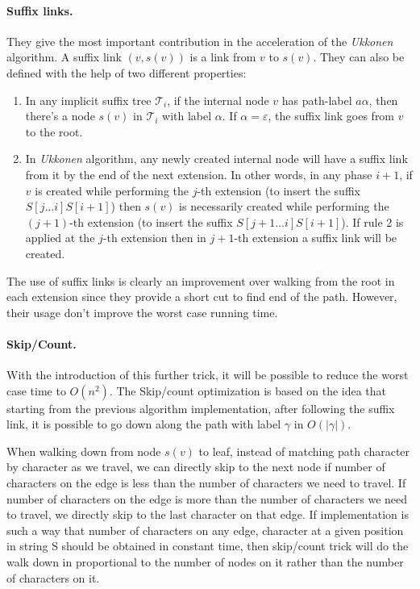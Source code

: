 \paragraph*{Suffix links.} They give the most important contribution in the acceleration of the \textit{Ukkonen} algorithm. A suffix link $(v, s(v))$ is a link from $v$ to $s(v)$. They can also be defined with the help of two different properties:
\begin{enumerate}
	\item In any implicit suffix tree $\mathcal{T}_i$, if the internal node $v$ has path-label $a \alpha$, then there's a node $s(v)$ in $\mathcal{T}_i$ with label $\alpha$. If $\alpha = \varepsilon$, the suffix link goes from $v$ to the root.
	\item In \textit{Ukkonen} algorithm, any newly created internal node will have a suffix link from it by the end of the next extension. In other words, in any phase $i+1$, if $v$ is created while performing the $j$-th extension (to insert the suffix $S[j \dots i]S[i+1]$) then $s(v)$ is necessarily created while performing the $(j+1)$-th extension (to insert the suffix $S[j+1 \dots i]S[i+1]$). If rule 2 is applied at the $j$-th extension then in $j+1$-th extension a suffix link will be created.
\end{enumerate} 
The use of suffix links is clearly an improvement over walking from the root in each extension since they provide a short cut to find end of the path. However, their usage don't improve the worst case running time.

\paragraph*{Skip/Count.} With the introduction of this further trick, it will be possible to reduce the worst case time to $O(n^2)$. The Skip/count optimization is based on the idea that starting from the previous algorithm implementation, after following the suffix link, it is possible to go down along the path with label $\gamma$ in $O(|\gamma|)$. 

When walking down from node $s(v)$ to leaf, instead of matching path character by character as we travel, we can directly skip to the next node if number of characters on the edge is less than the number of characters we need to travel. If number of characters on the edge is more than the number of characters we need to travel, we directly skip to the last character on that edge.
If implementation is such a way that number of characters on any edge, character at a given position in string S should be obtained in constant time, then skip/count trick will do the walk down in proportional to the number of nodes on it rather than the number of characters on it.


